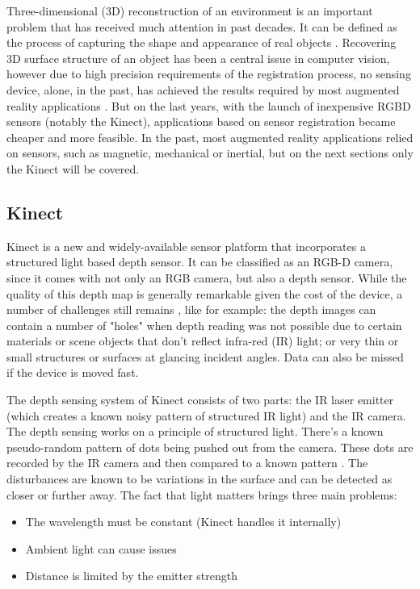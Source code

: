 \documentclass[msc, a4paper, classic, en]{ufbathesis}
\begin{document}
Three-dimensional (3D) reconstruction of an environment is an important problem that has received much attention in past decades. It can be defined as the process of capturing the shape and appearance of real objects \cite{chandra20123}. Recovering 3D surface structure of an object has been a central issue in computer vision, however due to high precision requirements of the registration process, no sensing device, alone, in the past, has achieved the results required by most augmented reality applications \cite{vall98}. But on the last years, with the launch of inexpensive RGBD sensors (notably the Kinect), applications based on sensor registration became cheaper and more feasible. In the past, most augmented reality applications relied on sensors, such as magnetic, mechanical or inertial, but on the next sections only the Kinect will be covered.

\subsection{Kinect}
\label{sec:kinect}

Kinect \cite{kinect} is a new and widely-available sensor platform that incorporates a structured light based depth sensor. It can be classified as an RGB-D camera, since it comes with not only an RGB camera, but also a depth sensor. While the quality of this depth map is generally remarkable given the cost of the device, a number of challenges still remains \cite{kinfu2}, like for example: the depth images can contain a number of "holes" when depth reading was not possible due to certain materials or scene objects that don't reflect infra-red (IR) light; or very thin or small structures or surfaces at glancing incident angles. Data can also be missed if the device is moved fast.

The depth sensing system of Kinect consists of two parts: the IR laser emitter (which creates a known noisy pattern of structured IR light) and the IR camera. The depth sensing works on a principle of structured light. There's a known pseudo-random pattern of dots being pushed out from the camera. These dots are recorded by the IR camera and then compared to a known pattern \cite{hackingkinect}. The disturbances are known to be variations in the surface and can be detected as closer or further away. The fact that light matters brings three main problems:

\begin{itemize}
  \item The wavelength must be constant (Kinect handles it internally)
  \item Ambient light can cause issues
  \item Distance is limited by the emitter strength
\end{itemize}
\end{document}

